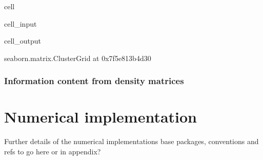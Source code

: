 \documentclass[letterpaper,table,10pt,english]{jupyterBook}
\begin{document}
\begin{sphinxuseclass}{cell}\begin{sphinxVerbatimInput}

\begin{sphinxuseclass}{cell_input}
\begin{sphinxVerbatim}[commandchars=\\\{\}]
\end{sphinxVerbatim}

\end{sphinxuseclass}\end{sphinxVerbatimInput}
\begin{sphinxVerbatimOutput}

\begin{sphinxuseclass}{cell_output}
\begin{sphinxVerbatim}[commandchars=\\\{\}]
\PYGZlt{}seaborn.matrix.ClusterGrid at 0x7f5e813b4d30\PYGZgt{}
\end{sphinxVerbatim}

\noindent{}

\end{sphinxuseclass}\end{sphinxVerbatimOutput}

\end{sphinxuseclass}

\subsection{Information content from density matrices}
\label{\detokenize{part1/theory_info_content_221122:information-content-from-density-matrices}}
\sphinxstepscope


\chapter{Numerical implementation}
\label{\detokenize{part1/numerics_231122:numerical-implementation}}\label{\detokenize{part1/numerics_231122:sec-numerical-details}}\label{\detokenize{part1/numerics_231122::doc}}
\sphinxAtStartPar
Further details of the numerical implementations \sphinxhyphen{} base packages, conventions and refs \sphinxhyphen{} to go here or in appendix?
\end{document}
